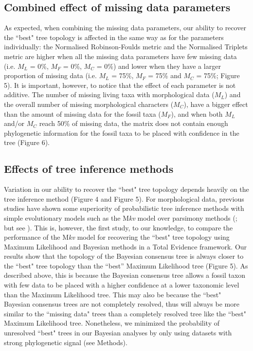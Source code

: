 \documentclass[12pt,letterpaper]{article}
\begin{document}
\subsection{Combined effect of missing data parameters}
As expected, when combining the missing data parameters, our ability to recover the ``best" tree topology is affected in the same way as for the parameters individually: the Normalised Robinson-Foulds metric and the Normalised Triplets metric are higher when all the missing data parameters have few missing data (i.e. $M_{L}$ = 0\%, $M_{F}$ = 0\%, $M_{C}$ = 0\%) and lower when they have a larger proportion of missing data (i.e. $M_{L}$ = 75\%, $M_{F}$ = 75\% and $M_{C}$ = 75\%; Figure 5).
It is important, however, to notice that the effect of each parameter is not additive.
The number of missing living taxa with morphological data ($M_{L}$) and the overall number of missing morphological characters ($M_{C}$), have a bigger effect than the amount of missing data for the fossil taxa ($M_{F}$), and when both $M_{L}$ and/or $M_{C}$ reach 50\% of missing data, the matrix does not contain enough phylogenetic information for the fossil taxa to be placed with confidence in the tree (Figure 6).

\subsection{Effects of tree inference methods}
Variation in our ability to recover the ``best" tree topology depends heavily on the tree inference method (Figure 4 and Figure 5).
For morphological data, previous studies have shown some superiority of probabilistic tree inference methods with simple evolutionary models such as the M\textit{kv} model \citep{lewisa2001} over parsimony methods (\citealp{wrightbayesian2014}; but see \citealp{spencerefficacy2013}).
This is, however, the first study, to our knowledge, to compare the performance of the M\textit{kv} model \citep{lewisa2001} for recovering the ``best" tree topology using Maximum Likelihood and Bayesian methods in a Total Evidence framework.
Our results show that the topology of the Bayesian consensus tree is always closer to the ``best" tree topology than the ``best'' Maximum Likelihood tree (Figure 5).
As described above, this is because the Bayesian consensus tree allows a fossil taxon with few data to be placed with a higher confidence at a lower taxonomic level than the Maximum Likelihood tree.
This may also be because the ``best" Bayesian consensus trees are not completely resolved, thus will always be more similar to the ``missing data" trees than a completely resolved tree like the ``best" Maximum Likelihood tree.
Nonetheless, we minimized the probability of unresolved ``best" trees in our Bayesian analyses by only using datasets with strong phylogenetic signal (see Methods).
\end{document}
